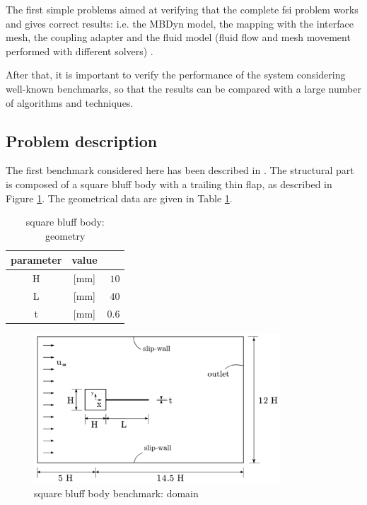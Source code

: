 The first simple problems aimed at verifying that the complete \acrshort{fsi} problem works and gives correct results: i.e. the MBDyn model, the mapping with the interface mesh, the coupling adapter and the fluid model (fluid flow and mesh movement performed with different solvers) .

After that, it is important to verify the performance of the system considering well-known benchmarks, so that the results can be compared with a large number of algorithms and techniques.

\subsection{Problem description}

The first benchmark considered here has been described in \cite{ramm1998fluid}. The structural part is composed of a square bluff body with a trailing thin flap, as described in Figure \ref{fig:sq_domain}. The geometrical data are given in Table \ref{table:sq-geom}.

\begin{table}[!htb]
	\begin{center}
		\begin{tabular}{ c c | r } 
			\multicolumn{2|}{c}{parameter} & value   \\ 
			\hline
			H  & [\si{mm}] & $10$     \\
			L & [\si{mm}] & $40$  \\
			t  & [\si{mm}] & $0.6$  \\			
		\end{tabular}
	\end{center}
	\caption{square bluff body: geometry}
	\label{table:sq-geom}
\end{table}

\begin{figure}[htbp!]
	\centering
	\includegraphics[width=0.82\textwidth, trim=0 0 0 0, clip]{images/sq-cyl/sq-cyl-domain.png}
	\caption{square bluff body benchmark: domain}
	\label{fig:sq_domain}
\end{figure}

